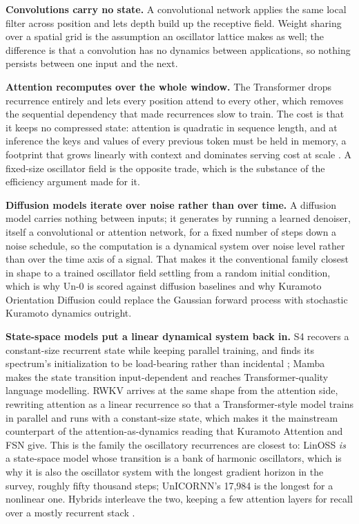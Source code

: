 \documentclass[a4paper,fleqn]{cas-sc}
\begin{document}
\textbf{Convolutions carry no state.} A convolutional network
\citep{lecun1998} applies the same local filter across position and lets
depth build up the receptive field. Weight sharing over a spatial grid
is the assumption an oscillator lattice makes as well; the difference is
that a convolution has no dynamics between applications, so nothing
persists between one input and the next.

\textbf{Attention recomputes over the whole window.} The Transformer
\citep{vaswani2017} drops recurrence entirely and lets every position
attend to every other, which removes the sequential dependency that made
recurrences slow to train. The cost is that it keeps no compressed
state: attention is quadratic in sequence length, and at inference the
keys and values of every previous token must be held in memory, a
footprint that grows linearly with context and dominates serving cost at
scale \citep{kwon2023}. A fixed-size oscillator field is the opposite
trade, which is the substance of the efficiency argument made for it.

\textbf{Diffusion models iterate over noise rather than over time.} A
diffusion model \citep{sohl-dickstein2015, ho2020} carries nothing
between inputs; it generates by running a learned denoiser, itself a
convolutional or attention network, for a fixed number of steps down a
noise schedule, so the computation is a dynamical system over noise
level rather than over the time axis of a signal. That makes it the
conventional family closest in shape to a trained oscillator field
settling from a random initial condition, which is why Un-0 is scored
against diffusion baselines and why Kuramoto Orientation Diffusion could
replace the Gaussian forward process with stochastic Kuramoto dynamics
outright.

\textbf{State-space models put a linear dynamical system back in.} S4
\citep{s4} recovers a constant-size recurrent state while keeping
parallel training, and finds its spectrum's initialization to be
load-bearing rather than incidental \citep{how-train-your-hippo}; Mamba
\citep{mamba} makes the state transition input-dependent and reaches
Transformer-quality language modelling. RWKV \citep{peng2023} arrives at
the same shape from the attention side, rewriting attention as a linear
recurrence so that a Transformer-style model trains in parallel and runs
with a constant-size state, which makes it the mainstream counterpart of
the attention-as-dynamics reading that Kuramoto Attention and FSN give.
This is the family the oscillatory recurrences are closest to: LinOSS
\emph{is} a state-space model whose transition is a bank of harmonic
oscillators, which is why it is also the oscillator system with the
longest gradient horizon in the survey, roughly fifty thousand steps;
UnICORNN's 17,984 is the longest for a nonlinear one. Hybrids interleave
the two, keeping a few attention layers for recall over a mostly
recurrent stack \citep{lieber2024}.
\end{document}
